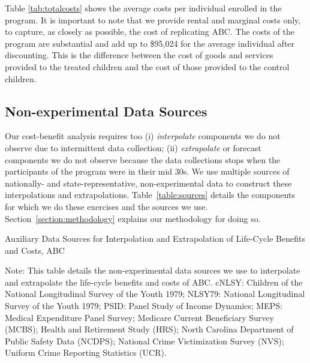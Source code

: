\noindent Table \ref{tab:totalcosts} shows the average costs per individual enrolled
in the program. It is important to note that we provide rental and marginal costs only, to capture, as closely as possible, the cost of replicating ABC. The costs of the program are substantial and add up to \$95,024 for the average individual after discounting. This is the difference between the cost of goods and services provided to the treated children and the cost of those provided to the control children. \\

\subsection{Non-experimental Data Sources}

\noindent Our cost-benefit analysis requires too (i) \textit{interpolate} components we do not observe due to intermittent data collection; (ii) \textit{extrapolate} or forecast components we do not observe because the data collections stops when the participants of the program were in their mid 30s. We use multiple sources of nationally- and state-representative, non-experimental data to construct these interpolations and extrapolations. Table~\ref{table:sources} details the components for which we do these exercises and the sources we use. Section~\ref{section:methodology} explains our methodology for doing so. 

\begin{table}[H]
\begin{threeparttable}
\caption{Auxiliary Data Sources for Interpolation and Extrapolation of Life-Cycle Benefits and Costs, ABC} \label{table:sources}
\footnotesize

\begin{tablenotes}
\footnotesize
Note: This table details the non-experimental data sources we use to interpolate and extrapolate the life-cycle benefits and costs of ABC. cNLSY: Children of the National Longitudinal Survey of the Youth 1979; NLSY79: National Longitudinal Survey of the Youth 1979; PSID: Panel Study of Income Dynamics; MEPS: Medical Expenditure Panel Survey; Medicare Current Beneficiary Survey (MCBS); Health and Retirement Study (HRS); North Carolina Department of Public Safety Data (NCDPS); National Crime Victimization Survey (NVS); Uniform Crime Reporting Statistics (UCR).
\end{tablenotes}
\end{threeparttable}
\end{table}

